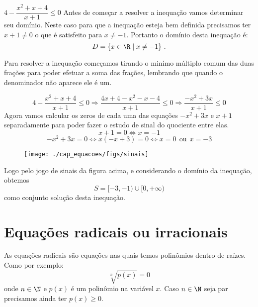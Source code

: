  \begin{exem}
  $4 - \dfrac{x^2+x+4}{x+1} \leq 0$
   \vskip0.3cm
  Antes de começar a resolver a inequação vamos determinar seu domínio. Neste caso para que a inequação esteja bem definida precisamos ter $x+1 \neq 0$ o que é satisfeito para $x \neq -1$. Portanto o domínio desta inequação é:
  \[D= \{x \in \R \mid x \neq -1\} \ .\]
  
  Para resolver a inequação começamos tirando o minímo múltiplo comum das duas frações para poder efetuar a soma das frações, lembrando que quando o denominador não aparece ele é um.

  \[4 - \frac{x^2+x+4}{x+1} \leq 0 \Rightarrow
    \frac{4x+4-x^2-x-4}{x+1} \leq 0 \Rightarrow
    \frac{-x^2 + 3x}{x+1} \leq 0
  \]
  Agora vamos calcular os zeros de cada uma das equações $-x^2 + 3x$ e $x+1$ separadamente para poder fazer o estudo de sinal do quociente entre elas.
\begin{equation}
x+1=0 \Leftrightarrow x= -1
\end{equation}
\begin{equation}
-x^2 + 3x= 0 \Leftrightarrow x(-x+3)=0 \Leftrightarrow x=0 \ \ \text{ou} \ \ x=-3
\end{equation}
   \begin{figure}[H]
 \centering
 \texttt{[image: ./cap\_equacoes/figs/sinais]}
 \end{figure}

 Logo pelo jogo de sinais da figura acima, e considerando o domínio da inequação, obtemos
\begin{equation}
S= [-3, -1) \cup [0, +\infty)
\end{equation}
 como conjunto solução desta inequação.

 \end{exem}



 \section{Equações radicais ou irracionais}
 \vskip0.3cm
 \colorbox{azul}{
 \begin{minipage}{0.9\linewidth}
 \begin{center}
  As equações radicais são equações nas quais temos polinômios dentro de raízes. Como por exemplo:
  \[\sqrt[n]{p(x)}= 0\]
  onde $n \in \N$ e $p(x)$ é um polinômio na variável $x$. Caso $n \in \N$ seja par precisamos ainda ter $p(x) \geqslant 0$.
 \end{center}
 \end{minipage}}
 \vskip0.3cm
 
